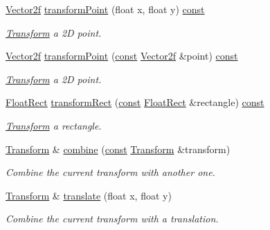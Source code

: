 \begin{DoxyCompactItemize}
\hyperlink{namespacesf_a80cea3c46537294fd1d8d428566ad8b2}{Vector2f} \hyperlink{classsf_1_1_transform_af20913c6a27087c26192c116397ab40a}{transform\-Point} (float x, float y) \hyperlink{term__entry_8h_a57bd63ce7f9a353488880e3de6692d5a}{const} 
\begin{DoxyCompactList}\small\item\em \hyperlink{classsf_1_1_transform}{Transform} a 2\-D point. \end{DoxyCompactList}\item 
\hyperlink{namespacesf_a80cea3c46537294fd1d8d428566ad8b2}{Vector2f} \hyperlink{classsf_1_1_transform_ac322cd8f6d606598d1aacc4d1d160ad6}{transform\-Point} (\hyperlink{term__entry_8h_a57bd63ce7f9a353488880e3de6692d5a}{const} \hyperlink{namespacesf_a80cea3c46537294fd1d8d428566ad8b2}{Vector2f} \&point) \hyperlink{term__entry_8h_a57bd63ce7f9a353488880e3de6692d5a}{const} 
\begin{DoxyCompactList}\small\item\em \hyperlink{classsf_1_1_transform}{Transform} a 2\-D point. \end{DoxyCompactList}\item 
\hyperlink{namespacesf_ab0d978f5903922a6bdfca1736b71ccc9}{Float\-Rect} \hyperlink{classsf_1_1_transform_a345112559981d988e92b54b7976fca8a}{transform\-Rect} (\hyperlink{term__entry_8h_a57bd63ce7f9a353488880e3de6692d5a}{const} \hyperlink{namespacesf_ab0d978f5903922a6bdfca1736b71ccc9}{Float\-Rect} \&rectangle) \hyperlink{term__entry_8h_a57bd63ce7f9a353488880e3de6692d5a}{const} 
\begin{DoxyCompactList}\small\item\em \hyperlink{classsf_1_1_transform}{Transform} a rectangle. \end{DoxyCompactList}\item 
\hyperlink{classsf_1_1_transform}{Transform} \& \hyperlink{classsf_1_1_transform_acd978f60421a0f839bb9a8263e8877ff}{combine} (\hyperlink{term__entry_8h_a57bd63ce7f9a353488880e3de6692d5a}{const} \hyperlink{classsf_1_1_transform}{Transform} \&transform)
\begin{DoxyCompactList}\small\item\em Combine the current transform with another one. \end{DoxyCompactList}\item 
\hyperlink{classsf_1_1_transform}{Transform} \& \hyperlink{classsf_1_1_transform_ab54f6c8070cc05e2afcb3145fbf4395a}{translate} (float x, float y)
\begin{DoxyCompactList}\small\item\em Combine the current transform with a translation. \end{DoxyCompactList}\item 

\end{DoxyCompactItemize}
